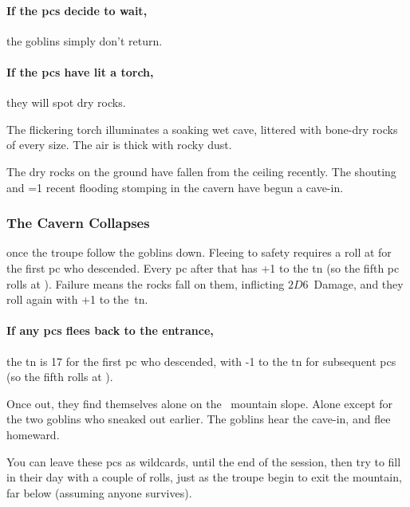 \begin{multicols}{2}
\paragraph{If the \glspl{pc} decide to wait,}
the goblins simply don't return.

\paragraph{If the \glspl{pc} have lit a torch,}
they will spot dry rocks.

\begin{boxtext}
  The flickering torch illuminates a soaking wet cave, littered with bone-dry rocks of every size.
  The air is thick with rocky dust.
\end{boxtext}

The dry rocks on the ground have fallen from the ceiling recently.
The shouting and \ifnum\value{temperature}=1 recent flooding \else stomping \fi in the cavern have begun a cave-in.


\subsubsection{The Cavern Collapses}
once the troupe follow the goblins down.
Fleeing to safety requires a  roll at \tn[3] for the first \gls{pc} who descended.
Every \gls{pc} after that has +1 to the \gls{tn} (so the fifth \gls{pc} rolls at \tn[7]).
Failure means the rocks fall on them, inflicting $2D6$~Damage, and they roll again with +1 to the~\gls{tn}.

\paragraph{If any \glspl{pc} flees back to the entrance,}
the \gls{tn} is 17 for the first \gls{pc} who descended, with -1 to the \gls{tn} for subsequent \glspl{pc} (so the fifth rolls at \tn[13]).

Once out, they find themselves alone on the \showTemperature\ mountain slope.
Alone except for the two goblins who sneaked out earlier.
The goblins hear the cave-in, and flee homeward.

\label{pcRunaways}
You can leave these \glspl{pc} as wildcards, until the end of the session, then try to fill in their day with a couple of rolls, just as the troupe begin to exit the mountain, far below (assuming anyone survives).


\end{multicols}
